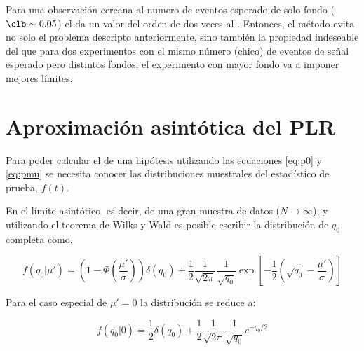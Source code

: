 Para una observación cercana al numero de eventos esperado de solo-fondo ($\clb
\sim 0.05$) el {\cls} da un valor del orden de dos veces al {\clsb}. Entonces,
el método {\cls} evita no solo el problema descripto anteriormente, sino también
la propiedad indeseable del {\clsb} que para dos experimentos con el mismo
número (chico) de eventos de señal esperado pero distintos fondos, el
experimento con mayor fondo va a imponer mejores límites.


\section{Aproximación asintótica del PLR}\label{sec:aprox}

Para poder calcular el {\pvalue} de una hipótesis utilizando las ecuaciones
\eqref{eq:p0} y \eqref{eq:pmu} se necesita conocer las distribuciones muestrales
del estadístico de prueba, $f(t)$.



En el límite asintótico, es decir, de una gran muestra de datos ($N\to\infty$)\cite{AsymAprox}, y
utilizando el teorema de Wilks\cite{WilksTheo} y Wald\cite{WaldTheo} es posible
escribir la distribución de $q_0$ completa como,

\begin{equation}
  f(q_0|\mu') = \left( 1 - \Phi\left(\frac{\mu'}{\sigma}\right)\right)
  \delta(q_0) + \frac{1}{2}\frac{1}{\sqrt{2\pi}}\frac{1}{\sqrt{q_0}} \exp \left[
    -\frac{1}{2} \left( \sqrt{q_0} - \frac{\mu'}{\sigma} \right)\right]
\end{equation}

Para el caso especial de $\mu' = 0$ la distribución se reduce a:

\begin{equation}
  f(q_0|0) = \frac{1}{2} \delta(q_0) +
  \frac{1}{2}\frac{1}{\sqrt{2\pi}}\frac{1}{\sqrt{q_0}} e^{-q_0/2}
\end{equation}

